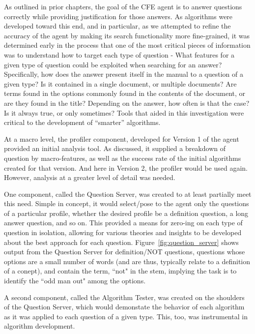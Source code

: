As outlined in prior chapters, the goal of the CFE agent is to answer questions correctly while providing justification for those answers.  As algorithms were developed toward this end, and in particular, as we attempted to refine the accuracy of the agent by making its search functionality more fine-grained, it was determined early in the process that one of the most critical pieces of information was to understand how to target each type of question - What features for a given type of question could be exploited when searching for an answer?  Specifically, how does the answer present itself in the manual to a question of a given type?  Is it contained in a single document, or multiple documents?  Are terms found in the options commonly found in the contents of the document, or are they found in the title?  Depending on the answer, how often is that the case?  Is it always true, or only sometimes?  Tools that aided in this investigation were critical to the development of ``smarter'' algorithms.  

At a macro level, the profiler component, developed for Version 1 of the agent provided an initial analysis tool.  As discussed, it supplied a breakdown of question by macro-features, as well as the success rate of the initial algorithms created for that version.  And here in Version 2, the profiler would be used again.  However, analysis at a greater level of detail was needed.

One component, called the Question Server, was created to at least partially meet this need.  Simple in concept, it would select/pose to the agent only the questions of a particular profile, whether the desired profile be a definition question, a long answer question, and so on.  This provided a means for zero-ing on each type of question in isolation, allowing for various theories and insights to be developed about the best approach for each question.  Figure~\ref{fig:question_server} shows output from the Question Server for definition/NOT questions, questions whose options are a small number of words (and are thus, typically relate to a definition of a conept), and contain the term, ``not" in the stem, implying the task is to identify the ``odd man out" among the options.

A second component, called the Algorithm Tester, was created on the shoulders of the Question Server, which would demonstate the behavior of each algorithm as it was applied to each question of a given type.  This, too, was instrumental in algorithm development.

